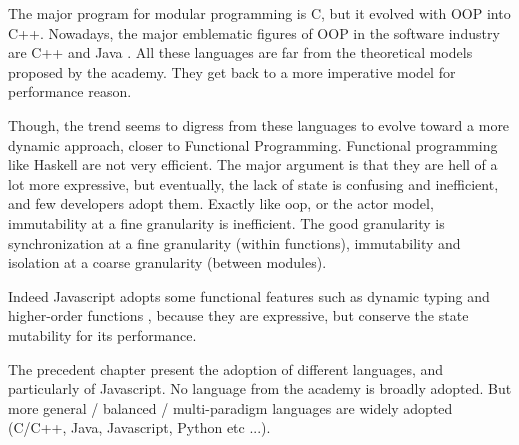 The major program for modular programming is C, but it evolved with OOP into C++.
Nowadays, the major emblematic figures of OOP in the software industry are C++ and Java \cite{Gosling2000,Stroustrup1986}.
All these languages are far from the theoretical models proposed by the academy.
They get back to a more imperative model for performance reason.

Though, the trend seems to digress from these languages to evolve toward a more dynamic approach, closer to Functional Programming.
Functional programming like Haskell are not very efficient.
The major argument is that they are hell of a lot more expressive, but eventually, the lack of state is confusing and inefficient, and few developers adopt them.
Exactly like oop, or the actor model, immutability at a fine granularity is inefficient.
The good granularity is synchronization at a fine granularity (within functions), immutability and isolation at a coarse granularity (between modules).

Indeed Javascript adopts some functional features such as dynamic typing and higher-order functions \cite{Ecma1999}, because they are expressive, but conserve the state mutability for its performance.

The precedent chapter present the adoption of different languages, and particularly of Javascript.
No language from the academy is broadly adopted.
But more general / balanced / multi-paradigm languages are widely adopted (C/C++, Java, Javascript, Python etc ...).






